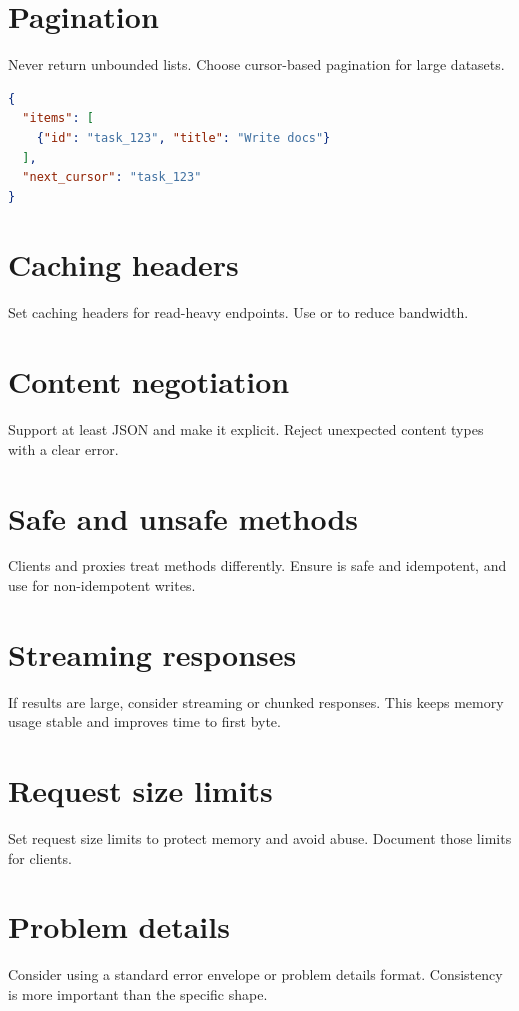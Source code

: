 \section{Pagination}
Never return unbounded lists.
Choose cursor-based pagination for large datasets.

\begin{lstlisting}[language=JSON]
{
  "items": [
    {"id": "task_123", "title": "Write docs"}
  ],
  "next_cursor": "task_123"
}
\end{lstlisting}

\section{Caching headers}
Set caching headers for read-heavy endpoints.
Use  or  to reduce bandwidth.

\section{Content negotiation}
Support at least JSON and make it explicit.
Reject unexpected content types with a clear error.

\section{Safe and unsafe methods}
Clients and proxies treat methods differently.
Ensure  is safe and idempotent, and use  for non-idempotent writes.

\section{Streaming responses}
If results are large, consider streaming or chunked responses.
This keeps memory usage stable and improves time to first byte.

\section{Request size limits}
Set request size limits to protect memory and avoid abuse.
Document those limits for clients.

\section{Problem details}
Consider using a standard error envelope or problem details format.
Consistency is more important than the specific shape.

